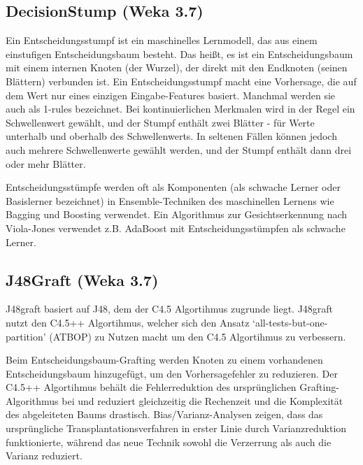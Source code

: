 \documentclass[12pt,					%
							 oneside,			%
							 a4paper,			%
							 halfparskip,		%
							 liststotoc,			%
							 bibtotoc,			%
							 fleqn,				%
							 pointlessnumbers]	%
							 {scrreprt}
\begin{document}
		\subsection{DecisionStump (Weka 3.7)}
			Ein Entscheidungsstumpf ist ein maschinelles Lernmodell, das aus einem einstufigen Entscheidungsbaum besteht. Das heißt, es ist ein Entscheidungsbaum mit einem internen Knoten (der Wurzel), der direkt mit den Endknoten (seinen Blättern) verbunden ist. Ein Entscheidungsstumpf macht eine Vorhersage, die auf dem Wert nur eines einzigen Eingabe-Features basiert. Manchmal werden sie auch als \glqq{}1-rules\grqq{} bezeichnet.	Bei kontinuierlichen Merkmalen wird in der Regel ein Schwellenwert gewählt, und der Stumpf enthält zwei Blätter - für Werte unterhalb und oberhalb des Schwellenwerts. In seltenen Fällen können jedoch auch mehrere Schwellenwerte gewählt werden, und der Stumpf enthält dann drei oder mehr Blätter.\cite{Ai92}

			Entscheidungsstümpfe werden oft als Komponenten (als \glqq{}schwache Lerner\grqq{} oder \glqq{}Basislerner\grqq{} bezeichnet) in Ensemble-Techniken des maschinellen Lernens wie Bagging und Boosting verwendet. Ein Algorithmus zur Gesichtserkennung nach Viola-Jones verwendet z.B. AdaBoost mit Entscheidungsstümpfen als schwache Lerner.\cite{Freund99}			
			
		\subsection{J48Graft (Weka 3.7)}		
			J48graft basiert auf J48, dem der C4.5 Algortihmus zugrunde liegt. J48graft nutzt den C4.5++ Algortihmus, welcher sich den Ansatz `all-tests-but-one-partition' (ATBOP) zu Nutzen macht um den C4.5 Algortihmus zu verbessern. 
			
			Beim Entscheidungsbaum-Grafting werden Knoten zu einem vorhandenen Entscheidungsbaum hinzugefügt, um den Vorhersagefehler zu reduzieren. Der C4.5++ Algortihmus behält die Fehlerreduktion des ursprünglichen Grafting-Algorithmus bei und reduziert gleichzeitig die Rechenzeit und die Komplexität des abgeleiteten Baums drastisch. Bias/Varianz-Analysen zeigen, dass das ursprüngliche Transplantationsverfahren in erster Linie durch Varianzreduktion funktionierte, während das neue Technik sowohl die Verzerrung als auch die Varianz reduziert.\cite{Webb1999} 	
			
\end{document}
